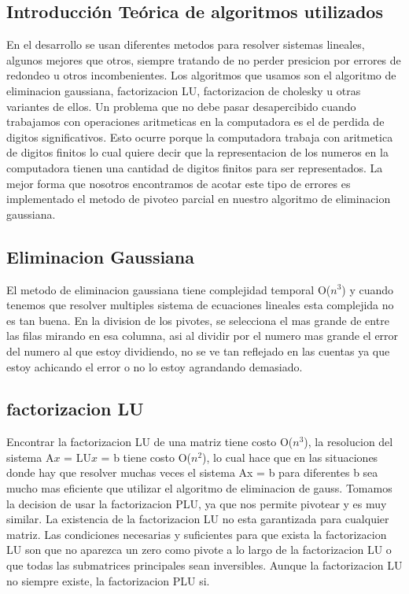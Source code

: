 \subsection{Introducci\'on Te\'orica de algoritmos utilizados}

En el desarrollo se usan diferentes metodos para resolver sistemas lineales, algunos mejores que otros, siempre tratando de no perder presicion por errores de redondeo u otros incombenientes.
Los algoritmos que usamos son el algoritmo de eliminacion gaussiana, factorizacion LU, factorizacion de cholesky u otras variantes de ellos.
Un problema que no debe pasar desapercibido cuando trabajamos con operaciones aritmeticas en la computadora es el de perdida de digitos significativos. Esto ocurre porque la computadora trabaja con aritmetica de digitos finitos lo cual quiere decir que la representacion de los numeros en la computadora tienen una cantidad de digitos finitos para ser representados.
La mejor forma que nosotros encontramos de acotar este tipo de errores es implementado el metodo de pivoteo parcial en nuestro algoritmo de eliminacion gaussiana.

\subsection{Eliminacion Gaussiana}
El metodo de eliminacion gaussiana tiene complejidad temporal O($n^{3}$) y cuando tenemos que resolver multiples sistema de ecuaciones lineales esta complejida no es tan buena.
En la division de los pivotes, se selecciona el mas grande de entre las filas mirando en esa columna, asi al dividir por el numero mas grande el error del numero al que estoy dividiendo, no se ve tan reflejado en las cuentas ya que estoy achicando el error o no lo estoy agrandando demasiado.


\subsection{factorizacion LU}
Encontrar la factorizacion LU de una matriz tiene costo O($n^{3}$), la resolucion del sistema A$x$ = LU$x$ = b tiene costo O($n^{2}$), lo cual hace que en las situaciones donde hay que resolver muchas veces el sistema Ax = b para diferentes b sea mucho mas eficiente que utilizar el algoritmo de eliminacion de gauss. 
Tomamos la decision de usar la factorizacion PLU, ya que nos permite pivotear y es muy similar. 
La existencia de la factorizacion LU no esta garantizada para cualquier matriz. Las condiciones necesarias y suficientes para que exista la factorizacion LU son que no aparezca un zero como pivote a lo largo de la factorizacion LU o que todas las submatrices principales sean inversibles. Aunque la factorizacion LU no siempre existe, la factorizacion PLU si.

